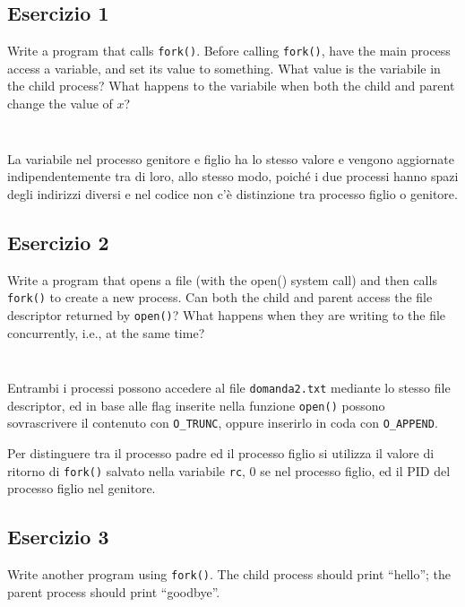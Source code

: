 \documentclass{article}
\numberwithin{equation}{subsection}
\begin{document}
\subsection{Esercizio 1}
Write a program that calls \verb|fork()|. Before calling \verb|fork()|, have the main process access a variable, and set its value to something. What 
value is the variabile in the child process? What happens to the variabile when both the child and parent change the value of $x$?

\inputminted[firstline=1,lastline=2]{c}{./Esercitazione del 29-10-24/domanda1.c}
\inputminted[firstline=8,lastline=15]{c}{./Esercitazione del 29-10-24/domanda1.c}

La variabile nel processo genitore e figlio ha lo stesso valore e vengono aggiornate indipendentemente tra di loro, 
allo stesso modo, poiché i due processi hanno spazi degli indirizzi diversi e nel codice non c'è distinzione 
tra processo figlio o genitore. 

\subsection{Esercizio 2}
Write a program that opens a file (with the open() system call) and then calls \verb|fork()| 
to create a new process. Can both the child and parent access the file descriptor returned 
by \verb|open()|? What happens when they are writing to the file concurrently, i.e., at the 
same time?

\inputminted[firstline=1, lastline=4]{c}{./Esercitazione del 29-10-24/domanda2.c}
\inputminted[firstline=13, lastline=26]{c}{./Esercitazione del 29-10-24/domanda2.c}

Entrambi i processi possono accedere al file \texttt{domanda2.txt} mediante lo stesso 
file descriptor, ed in base alle flag inserite nella funzione \verb|open()| possono 
sovrascrivere il contenuto con \verb|O_TRUNC|, oppure inserirlo in coda con \verb|O_APPEND|. 

Per distinguere tra il processo padre ed il processo figlio si utilizza il valore di ritorno 
di \verb|fork()| salvato nella variabile \verb|rc|, 0 se nel processo figlio, ed il PID 
del processo figlio nel genitore. 

\subsection{Esercizio 3}
Write another program using \verb|fork()|. The child process should print ``hello''; the parent process should print ``goodbye''.
\end{document}
